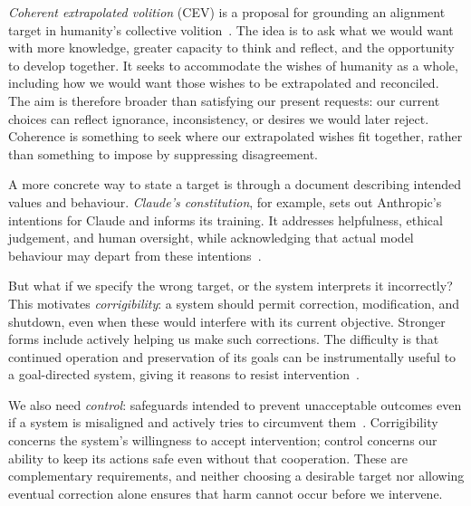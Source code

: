 \emph{Coherent extrapolated volition} (CEV) is a proposal for grounding an alignment target in humanity's collective volition~\cite[Section~3]{yudkowsky2004cev}. The idea is to ask what we would want with more knowledge, greater capacity to think and reflect, and the opportunity to develop together. It seeks to accommodate the wishes of humanity as a whole, including how we would want those wishes to be extrapolated and reconciled. The aim is therefore broader than satisfying our present requests: our current choices can reflect ignorance, inconsistency, or desires we would later reject. Coherence is something to seek where our extrapolated wishes fit together, rather than something to impose by suppressing disagreement.

A more concrete way to state a target is through a document describing intended values and behaviour. \emph{Claude's constitution}, for example, sets out Anthropic's intentions for Claude and informs its training. It addresses helpfulness, ethical judgement, and human oversight, while acknowledging that actual model behaviour may depart from these intentions~\cite{anthropic2026constitution}.

But what if we specify the wrong target, or the system interprets it incorrectly? This motivates \emph{corrigibility}: a system should permit correction, modification, and shutdown, even when these would interfere with its current objective. Stronger forms include actively helping us make such corrections. The difficulty is that continued operation and preservation of its goals can be instrumentally useful to a goal-directed system, giving it reasons to resist intervention~\cite{lesswrongCorrigibility}.

We also need \emph{control}: safeguards intended to prevent unacceptable outcomes even if a system is misaligned and actively tries to circumvent them~\cite{shlegerisGreenblatt2024control}. Corrigibility concerns the system's willingness to accept intervention; control concerns our ability to keep its actions safe even without that cooperation. These are complementary requirements, and neither choosing a desirable target nor allowing eventual correction alone ensures that harm cannot occur before we intervene.

